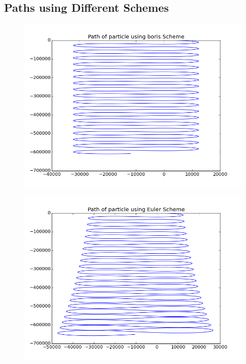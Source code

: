 \documentclass[11pt, a4paper]{article}
\begin{document}
\subsection{Paths using Different Schemes}
\begin{figure}[H]
 \centering
 \includegraphics[width = \textwidth]{q4_boris.png}
\end{figure}
\begin{figure}[H]
 \centering
 \includegraphics[width = \textwidth]{q4_euler.png}
\end{figure}
\end{document}
